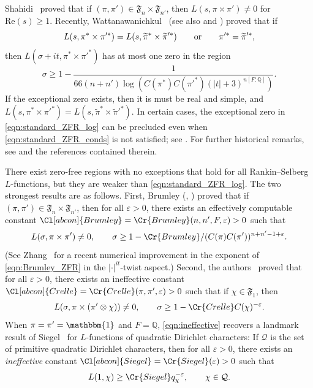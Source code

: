 \documentclass[12pt]{amsart}
\theoremstyle{definition}
\theoremstyle{remark}
\numberwithin{equation}{section}
\theoremstyle{plain}
\renewcommand{\tilde}{\widetilde}
\renewcommand{\epsilon}{\varepsilon}
\renewcommand{\Re}{\mathrm{Re}}
\newcommand{\re}{\Re}
\newcommand{\Q}{\mathbb{Q}}
\begin{document}
Shahidi~\cite{Shahidi} proved that if $(\pi,\pi')\in\mathfrak{F}_n\times\mathfrak{F}_{n'}$, then $L(s,\pi\times\pi')\neq 0$ for $\re(s)\geq 1$.  Recently, Wattanawanichkul~\cite[Theorems~1.2 and~1.3]{Wattanawanichkul} (see also \cite[Appendix]{Humphries} and \cite{HumphriesThorner}) proved that if
\begin{equation}
\label{eqn:standard_ZFR_conds}
L(s,\pi^*\times\pi'^*)=L(s,\tilde{\pi}^*\times\tilde{\pi}'^*)\qquad\textup{or}\qquad\pi'^*=\tilde{\pi}'^*,
\end{equation}
then $L(\sigma+it,\pi^*\times\pi'^*)$ has at most one zero in the region
\begin{equation}
\label{eqn:standard_ZFR_log}
\sigma\geq 1-\frac{1}{66(n+n')\log(C(\pi^*)C(\pi'^*)(|t|+3)^{n[F:\Q]})}.
\end{equation}
If the exceptional zero exists, then it is must be real and simple, and $L(s,\pi^*\times\pi'^*)=L(s,\tilde{\pi}^*\times\tilde{\pi}'^*)$. In certain cases, the exceptional zero in \eqref{eqn:standard_ZFR_log} can be precluded even when \eqref{eqn:standard_ZFR_conds} is not satisfied; see \cite{Luo,RamakrishnanWang,Thorner_Siegel1,Thorner_Siegel2}.  For further historical remarks, see \cite[Section~1]{HarcosThorner} and the references contained therein.

There exist zero-free regions with no exceptions that hold for all Rankin--Selberg $L$-functions, but they are weaker than \eqref{eqn:standard_ZFR_log}.  The two strongest results are as follows.  First, Brumley (\cite{Brumley}, \cite[Appendix]{Lapid}) proved that if $(\pi,\pi')\in\mathfrak{F}_n\times\mathfrak{F}_{n'}$, then for all $\epsilon>0$, there exists an effectively computable constant $\Cl[abcon]{Brumley}=\Cr{Brumley}(n,n',F,\epsilon)>0$ such that
\begin{equation}
\label{eqn:Brumley_ZFR}
L(\sigma,\pi\times\pi')\neq 0,\qquad \sigma \geq 1-\Cr{Brumley}/(C(\pi)C(\pi'))^{n+n'-1+\epsilon}.
\end{equation}
(See Zhang~\cite{Zhang} for a recent numerical improvement in the exponent of \eqref{eqn:Brumley_ZFR} in the $|\cdot|^{it}$-twist aspect.)  Second, the authors~\cite{HarcosThorner} proved that for all $\epsilon>0$, there exists an ineffective constant $\Cl[abcon]{Crelle}=\Cr{Crelle}(\pi,\pi',\epsilon)>0$ such that if $\chi\in\mathfrak{F}_1$, then
\begin{equation}
\label{eqn:ineffective}
L(\sigma,\pi\times(\pi'\otimes\chi))\neq 0,\qquad \sigma\geq 1-\Cr{Crelle}C(\chi)^{-\epsilon}.
\end{equation}
When $\pi=\pi'=\mathbbm{1}$ and $F=\Q$, \eqref{eqn:ineffective} recovers a landmark result of Siegel~\cite{Siegel} for $L$-functions of quadratic Dirichlet characters: If $\mathcal{Q}$ is the set of primitive quadratic Dirichlet characters, then for all $\epsilon>0$, there exists an {\it ineffective} constant $\Cl[abcon]{Siegel}=\Cr{Siegel}(\epsilon)>0$ such that
\begin{equation}
\label{eqn:Siegel}
L(1,\chi)\geq \Cr{Siegel}q_{\chi}^{-\epsilon},\qquad\chi\in\mathcal{Q}.
\end{equation}
\end{document}
